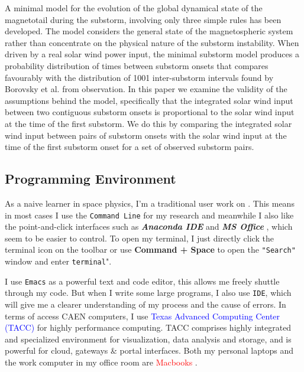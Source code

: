 \documentclass[12pt, letterpaper]{article} %
\begin{document}
A minimal model for the evolution of the global dynamical state of the magnetotail during the substorm, involving only three simple rules has been developed. The model considers the general state of the magnetospheric system rather than concentrate on the physical nature of the substorm instability. When driven by a real solar wind power input, the minimal substorm model produces a probability distribution of times between substorm onsets that compares favourably with the distribution of 1001 inter-substorm intervals found by Borovsky et al. from observation. In this paper we examine the validity of the assumptions behind the model, specifically that the integrated solar wind input between two contiguous substorm onsets is proportional to the solar wind input at the time of the first substorm. We do this by comparing the integrated solar wind input between pairs of substorm onsets with the solar wind input at the time of the first substorm onset for a set of observed substorm pairs.




\subsection{Programming Environment} %
As a naive learner in space physics, I'm a traditional  user work on . 
This means in most cases I use the \texttt{Command Line} for my research and meanwhile I also 
like the point-and-click interfaces such as \textit{\textbf{Anaconda IDE}}   and \textit{\textbf{MS Office}} , 
which seem to be easier to control. To open my terminal, I just directly click the terminal icon on the 
toolbar or use \textbf{Command + Space} to open the \texttt{"Search"} window and enter \texttt{terminal}". %

\noindent %
I use \texttt{Emacs} as a powerful text and code editor, this allows me freely shuttle through my code. But when I write some large programs, I also use \texttt{IDE}, which will give me a clearer understanding of my process and the cause of errors. In terms of access CAEN computers, I use \textcolor{blue}{Texas Advanced Computing Center (TACC)} for highly performance computing. TACC comprises highly integrated and specialized environment for visualization, data analysis and storage, and is powerful for cloud, gateways \& portal interfaces. Both my personal laptops and the work computer in my office room are \textcolor{red}{Macbooks} . 
\end{document}
